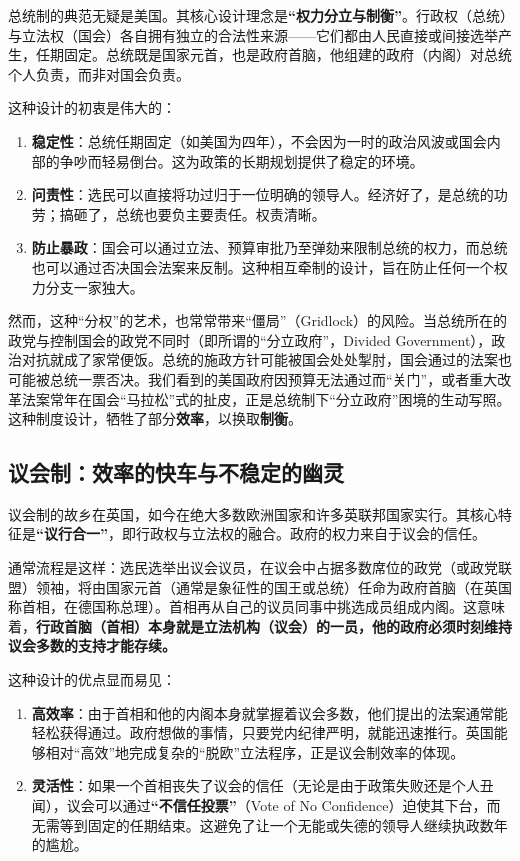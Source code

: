 \documentclass[a5paper, 11pt, openany]{ctexbook}
\begin{document}
总统制的典范无疑是美国。其核心设计理念是\textbf{“权力分立与制衡”}。行政权（总统）与立法权（国会）各自拥有独立的合法性来源——它们都由人民直接或间接选举产生，任期固定。总统既是国家元首，也是政府首脑，他组建的政府（内阁）对总统个人负责，而非对国会负责。

这种设计的初衷是伟大的：
\begin{enumerate}
    \item \textbf{稳定性}：总统任期固定（如美国为四年），不会因为一时的政治风波或国会内部的争吵而轻易倒台。这为政策的长期规划提供了稳定的环境。
    \item \textbf{问责性}：选民可以直接将功过归于一位明确的领导人。经济好了，是总统的功劳；搞砸了，总统也要负主要责任。权责清晰。
    \item \textbf{防止暴政}：国会可以通过立法、预算审批乃至弹劾来限制总统的权力，而总统也可以通过否决国会法案来反制。这种相互牵制的设计，旨在防止任何一个权力分支一家独大。
\end{enumerate}

然而，这种“分权”的艺术，也常常带来“僵局”（Gridlock）的风险。当总统所在的政党与控制国会的政党不同时（即所谓的“分立政府”，Divided Government），政治对抗就成了家常便饭。总统的施政方针可能被国会处处掣肘，国会通过的法案也可能被总统一票否决。我们看到的美国政府因预算无法通过而“关门”，或者重大改革法案常年在国会“马拉松”式的扯皮，正是总统制下“分立政府”困境的生动写照。这种制度设计，牺牲了部分\textbf{效率}，以换取\textbf{制衡}。

\subsection{议会制：效率的快车与不稳定的幽灵}

议会制的故乡在英国，如今在绝大多数欧洲国家和许多英联邦国家实行。其核心特征是\textbf{“议行合一”}，即行政权与立法权的融合。政府的权力来自于议会的信任。

通常流程是这样：选民选举出议会议员，在议会中占据多数席位的政党（或政党联盟）领袖，将由国家元首（通常是象征性的国王或总统）任命为政府首脑（在英国称首相，在德国称总理）。首相再从自己的议员同事中挑选成员组成内阁。这意味着，\textbf{行政首脑（首相）本身就是立法机构（议会）的一员，他的政府必须时刻维持议会多数的支持才能存续。}

这种设计的优点显而易见：
\begin{enumerate}
    \item \textbf{高效率}：由于首相和他的内阁本身就掌握着议会多数，他们提出的法案通常能轻松获得通过。政府想做的事情，只要党内纪律严明，就能迅速推行。英国能够相对“高效”地完成复杂的“脱欧”立法程序，正是议会制效率的体现。
    \item \textbf{灵活性}：如果一个首相丧失了议会的信任（无论是由于政策失败还是个人丑闻），议会可以通过\textbf{“不信任投票”}（Vote of No Confidence）迫使其下台，而无需等到固定的任期结束。这避免了让一个无能或失德的领导人继续执政数年的尴尬。
\end{enumerate}
\end{document}
